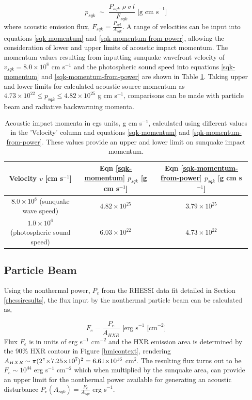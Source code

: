 \begin{equation}\label{sqk-momentum-from-power}
p_{sqk} \; \sim \; \frac{P_{sqk} \; \rho \; v \; l }{F_{sqk}} \text{ [g cm s}^{-1}]
\end{equation}
\noindent
where acoustic emission flux, $F_{sqk} = \frac{P_{sqk}}{A_{sqk}} $. A range of velocities can be input into equations \ref{sqk-momentum} and \ref{sqk-momentum-from-power}, allowing the consideration of lower and upper limits of acoustic impact momentum. The momentum values resulting from inputting sunquake wavefront velocity of $v_{sqk} = 8.0{\times}10^{8}$ cm s$^{-1}$ \citep{2014ApJ...796...85J} and the photospheric sound speed into equations \ref{sqk-momentum} and \ref{sqk-momentum-from-power} are shown in Table \ref{sqk-momenta}. Taking upper and lower limits for calculated acoustic source momentum as $4.73{\times}10^{22} \leq p_{sqk} \leq 4.82{\times}10^{25}$ g cm s$^{-1}$, comparisons can be made with particle beam and radiative backwarming momenta.\\
\begin{table}[h]
\centering
\begin{tabular}{|c|c|c|}
Velocity $v$ [cm s$^{-1}$] & Eqn \ref{sqk-momentum} $p_{sqk}$ [g cm s$^{-1}$] & Eqn \ref{sqk-momentum-from-power} $p_{sqk}$ [g cm s$^{-1}$]\\
\hline
$8.0{\times}10^{8}$ (sunquake wave speed) & $4.82{\times}10^{25}$ & $3.79{\times}10^{25}$\\
$1.0{\times}10^{6}$ (photospheric sound speed) & $6.03{\times}10^{22}$ & $4.73{\times}10^{22}$\\
\end{tabular}
\caption{Acoustic impact momenta in cgs units, g cm s$^{-1}$, calculated using different values in the 'Velocity' column and equations \ref{sqk-momentum} and \ref{sqk-momentum-from-power}. These values provide an upper and lower limit on sunquake impact momentum.}\label{sqk-momenta}
\end{table}


\subsection{Particle Beam}
Using the nonthermal power, $P_{e}$ from the RHESSI data fit detailed in Section \ref{rhessiresults}, the flux input by the nonthermal particle beam can be calculated as,

\begin{equation}\label{electronflux}
F_e = \frac{P_{e}}{A_{HXR}} \text{ [erg s}^{-1}\text{ [cm}^{-2}]
\end{equation}
\noindent
Flux $F_e$ is in units of erg s$^{-1}$ cm$^{-2}$ and the HXR emission area is determined by the $90\%$ HXR contour in Figure \ref{hmicontext}, rendering $A_{HXR} \sim \pi (2"{\times}7.25{\times}10^{7})^{2} = 6.61{\times}10^{16}$ cm$^{2}$. The resulting flux turns out to be $F_e \sim 10^{44}$ erg s$^{-1}$ cm$^{-2}$ which when multiplied by the sunquake area, can provide an upper limit for the nonthermal power available for generating an acoustic disturbance $P_{e}(A_{sqk}) = \frac{F_e}{A_{sqk}}$ erg s$^{-1}$. 

